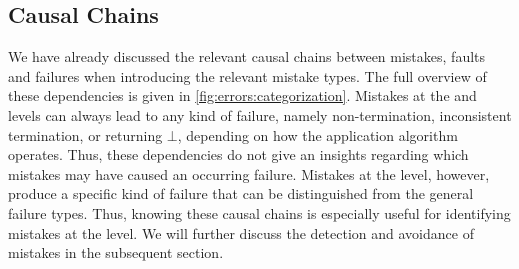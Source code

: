 



\subsection{Causal Chains}

We have already discussed the relevant causal chains between mistakes, faults and failures when introducing the relevant mistake types.
The full overview of these dependencies is given in \autoref{fig:errors:categorization}.
Mistakes at the \levelnetworkrelation and \levelnetworkrule levels can always lead to any kind of failure, namely non-termination, inconsistent termination, or returning $\bot$, depending on how the application algorithm operates.
Thus, these dependencies do not give an insights regarding which mistakes may have caused an occurring failure.
Mistakes at the \leveltransformation level, however, produce a specific kind of failure that can be distinguished from the general failure types.
Thus, knowing these causal chains is especially useful for identifying mistakes at the \leveltransformation level.
We will further discuss the detection and avoidance of mistakes in the subsequent section.

